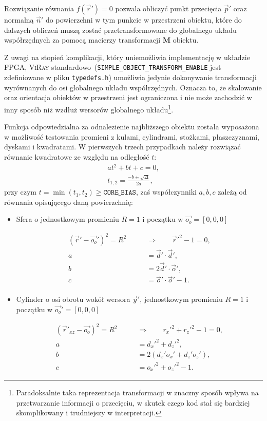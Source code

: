 \begin{enumerate}
Rozwiązanie równania $f(\vec{r}') = 0$ pozwala obliczyć punkt przecięcia $\vec{p}'$ oraz normalną $\vec{n}'$ do powierzchni w tym punkcie w przestrzeni obiektu, które do dalszych obliczeń muszą zostać przetransformowane do globalnego układu współrzędnych za pomocą macierzy transformacji $\mathbf{M}$ obiektu.

Z uwagi na stopień komplikacji, który uniemożliwia implementację w układzie FPGA, \textsc{ViRay} standardowo~(\texttt{SIMPLE\_OBJECT\_TRANSFORM\_ENABLE} jest zdefiniowane w pliku \texttt{typedefs.h}) umożliwia jedynie dokonywanie transformacji wyrównanych do osi globalnego układu współrzędnych. Oznacza to, że skalowanie oraz orientacja obiektów w przestrzeni jest ograniczona i nie może zachodzić w inny sposób niż wzdłuż wersorów globalnego układu\footnote{Paradoksalnie taka reprezentacja transformacji w znaczny sposób wpływa na przetwarzanie informacji o przecięciu, w skutek czego kod stał się bardziej skomplikowany i trudniejszy w interpretacji.}. 

Funkcja odpowiedzialna za odnalezienie najbliższego obiektu została wyposażona w możliwość testowania promieni z kulami, cylindrami, stożkami, płaszczyznami, dyskami i kwadratami. W pierwszych trzech przypadkach należy rozwiązać równanie kwadratowe ze względu na odległość $t$:
\begin{align*}
at^2 + bt + c = 0,\\
t_{1,2} = \frac{-b\pm\sqrt{\Delta}}{2a},
\end{align*}
przy czym $t = \min(t_1, t_2) \geq \mathtt{CORE\_BIAS}$, zaś współczynniki $a, b, c$ zależą od równania opisującego daną powierzchnię:
\begin{itemize}
\item Sfera o jednostkowym promieniu $R=1$ i początku w $\vec{o_o} = [0,0,0]$

\begin{align*}
(\vec{r}' - \vec{o_o}')^2 = R^2\qquad &\Rightarrow \qquad\vec{r}'^2 - 1 = 0,\\
a &= \vec{d}'\cdot\vec{d}',\\
b &= 2\vec{d}'\cdot\vec{o}',\\
c &= \vec{o}'\cdot\vec{o}' - 1.\\
\end{align*}

\item Cylinder o osi obrotu wokół wersora $\vec{y}'$, jednostkowym promieniu $R=1$ i początku w $\vec{o_o}' = [0,0,0]$

\begin{align*}
(\vec{r}'_{xz} - \vec{o_o})^2 = R^2\qquad &\Rightarrow\qquad r_x'^2 + r_z'^2 - 1 = 0,\\
a &= d_x'^2 + d_z'^2,\\
b &= 2\left(d_x'o_x' + d_z'o_z' \right),\\
c &= o_x'^2 + o_z'^2 - 1.
\end{align*}


\end{itemize}
\end{enumerate}
